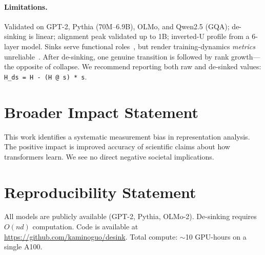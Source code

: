 \documentclass[11pt]{article}
\begin{document}
\paragraph{Limitations.}
Validated on GPT-2, Pythia (70M--6.9B), OLMo, and Qwen2.5 (GQA); de-sinking is linear; alignment peak validated up to 1B; inverted-U profile from a 6-layer model.
Sinks serve functional roles~\citep{barbero2025why,queipodellano2025sinks,zhang2025catch}, but render training-dynamics \emph{metrics} unreliable~\citep[cf.][]{li2025tracing,kulkarni2026disentangling}. After de-sinking, one genuine transition is followed by rank growth---the opposite of collapse. We recommend reporting both raw and de-sinked values: \texttt{H\_ds = H - (H @ s) * s}.

\section*{Broader Impact Statement}
This work identifies a systematic measurement bias in representation analysis.
The positive impact is improved accuracy of scientific claims about how transformers learn.
We see no direct negative societal implications.

\section*{Reproducibility Statement}
All models are publicly available (GPT-2, Pythia, OLMo-2).
De-sinking requires $O(nd)$ computation.
Code is available at \url{https://github.com/kaminoguo/desink}.
Total compute: ${\sim}$10 GPU-hours on a single A100.
\end{document}
